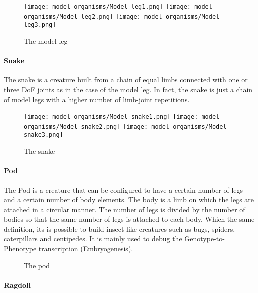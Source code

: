 \documentclass[main]{subfiles}
\begin{document}
\begin{figure}[!h]
\centering
\texttt{[image: model-organisms/Model-leg1.png]}
\texttt{[image: model-organisms/Model-leg2.png]}
\texttt{[image: model-organisms/Model-leg3.png]}
\caption[The model leg]{The model leg}
\label{figure:model-leg}
\end{figure}

\paragraph{Snake}

The snake is a creature built from a chain of equal limbs connected with one or three DoF joints as in the case of the model leg. In fact, the snake is just a chain of model legs with a higher number of limb-joint repetitions.

\begin{figure}[!h]
\centering
\texttt{[image: model-organisms/Model-snake1.png]}
\texttt{[image: model-organisms/Model-snake2.png]}
\texttt{[image: model-organisms/Model-snake3.png]}
\caption[The snake]{The snake}
\label{figure:snake}
\end{figure}

\paragraph{Pod}

The Pod is a creature that can be configured to have a certain number of legs and a certain number of body elements. The body is a limb on which the legs are attached in a circular manner. The number of legs is divided by the number of bodies so that the same number of legs is attached to each body. Which the same definition, its is possible to build insect-like creatures such as bugs, spiders, caterpillars and centipedes. It is mainly used to debug the Genotype-to-Phenotype transcription (Embryogenesis).

\begin{figure}[!h]
\centering
{}
\caption[The pod]{The pod}
\label{figure:pod}
\end{figure}


\paragraph{Ragdoll}
\end{document}
